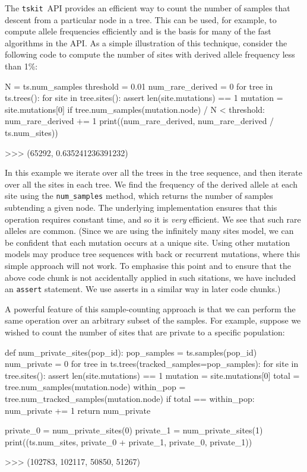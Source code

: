 \documentclass[graybox]{svmult}
\newcommand{\tskit}[0]{\texttt{tskit}}
\begin{document}
The \tskit\ API provides an efficient way to count the number of samples that
descent from  a particular node in a tree. This can be used,
for example, to compute allele frequencies efficiently and is the basis
for many of the fast algorithms in the API. As a simple illustration of
this technique, consider the following code to compute the number of
sites with derived allele frequency less than 1\%:

\begin{pythoncode}
N = ts.num_samples
threshold = 0.01
num_rare_derived = 0
for tree in ts.trees():
    for site in tree.sites():
        assert len(site.mutations) == 1
        mutation = site.mutations[0]
        if tree.num_samples(mutation.node) / N < threshold:
            num_rare_derived += 1
print((num_rare_derived, num_rare_derived / ts.num_sites))

>>> (65292, 0.635241236391232)
\end{pythoncode}

In this example we iterate over all the trees in the tree sequence, and
then iterate over all the sites in each tree. We find the frequency
of the derived allele at each site using the \texttt{num\_samples}
method, which returns the number of samples subtending a given
node. The underlying implementation ensures that this operation requires
constant time, and so it is \emph{very} efficient. We see that such rare alleles are common.
(Since we are using the infinitely many sites model, we can be confident that
each mutation occurs at a unique site. Using other mutation models may produce
tree sequences with back or recurrent mutations, where this simple approach
will not work. To emphasise this point and to ensure that
the above code chunk is not accidentally applied in such sitations, we have included an
\texttt{assert} statement. We use asserts in a similar way in later code chunks.)

A powerful feature of this sample-counting approach is that we can
perform the same operation over an arbitrary subset of the samples. For
example, suppose we wished to count the number of sites that are private
to a specific population:

\begin{pythoncode}
def num_private_sites(pop_id):
    pop_samples = ts.samples(pop_id)
    num_private = 0
    for tree in ts.trees(tracked_samples=pop_samples):
        for site in tree.sites():
            assert len(site.mutations) == 1
            mutation = site.mutations[0]
            total = tree.num_samples(mutation.node)
            within_pop = tree.num_tracked_samples(mutation.node)
            if total == within_pop:
                num_private += 1
    return num_private

private_0 = num_private_sites(0)
private_1 = num_private_sites(1)
print((ts.num_sites, private_0 + private_1, private_0, private_1))

>>> (102783, 102117, 50850, 51267)
\end{pythoncode}
\end{document}
